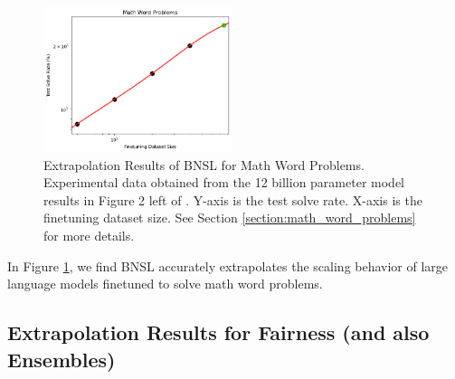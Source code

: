 \documentclass{article} %
\begin{document}
\begin{figure}[htbp]
    \centering
\includegraphics[width=0.49\textwidth]{figures/math_word_problems/dataset_size__12b_params.png}
    \caption{
Extrapolation Results of BNSL for Math Word Problems. Experimental data obtained from the 12 billion parameter model results in Figure 2 left of \cite{cobbe2021training}. Y-axis is the test solve rate. X-axis is the finetuning dataset size. See Section \ref{section:math_word_problems} for more details.
    }
    \label{fig:math_word_problems}
\end{figure}

In Figure \ref{fig:math_word_problems}, we find BNSL accurately extrapolates the scaling behavior of large language models finetuned to solve math word problems.


\subsection{Extrapolation Results for Fairness (and also Ensembles)}
\label{section:fairness}
\end{document}
